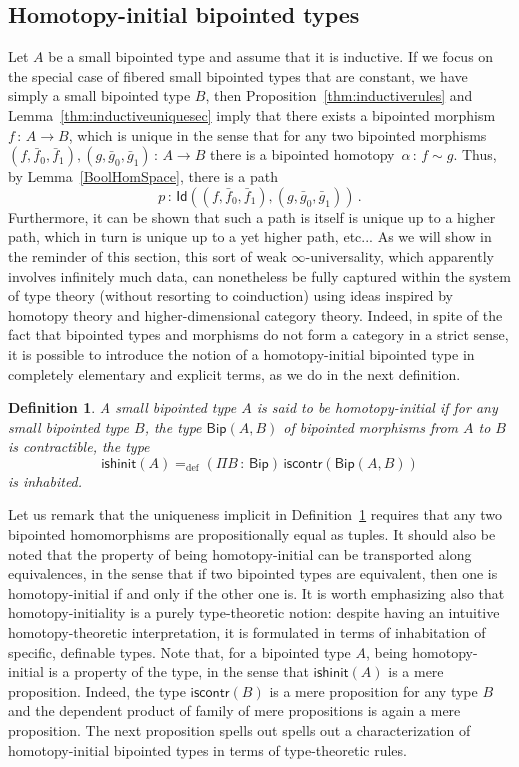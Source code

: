 \documentclass[10pt,a4paper,oneside,reqno]{amsart}
\numberwithin{equation}{section}
\theoremstyle{mythm}
\theoremstyle{mydef}
\newtheorem{definition}[theorem]{Definition}
\theoremstyle{myrmk}
\newcommand{\ie}{\text{i.e.\ }}
\newcommand{\defeq}{=_{\mathrm{def}}}
\newcommand{\co}{\,{:}\,}
\newcommand{\iscontr}{\mathsf{iscontr}}
\newcommand{\ishinit}{\mathsf{ishinit}}
\newcommand{\Id}{\mathsf{Id}}
\newcommand{\Bip}{\mathsf{Bip}}
\newcommand{\BipHom}{\mathsf{Bip}}
\begin{document}
\subsection{Homotopy-initial bipointed types} 
 Let $A$ be a small bipointed type and assume that it is inductive. 
  If we focus on the special case of fibered small bipointed types that 
are constant, \ie we have simply a small bipointed type $B$, then 
 Proposition~\ref{thm:inductiverules} and Lemma~\ref{thm:inductiveuniquesec}
imply that there exists a bipointed morphism~$f \co A \to B$, which is unique in the sense that  for any two bipointed morphisms $(f, \bar{f}_0, \bar{f}_1), (g, \bar{g}_0, \bar{g}_1) \co A \to B$  there is a bipointed homotopy~$\alpha \co f \sim g$. Thus, by Lemma~\ref{BoolHomSpace}, there is a path 
\[
p \co \Id((f, \bar{f}_0, \bar{f}_1), (g, \bar{g}_0, \bar{g}_1)) \, .
\] 
Furthermore, it can be shown that such a path is itself is unique up to a higher path, which in turn is unique up to a yet higher path, etc... As we will show in the reminder of this section, this sort of weak $\infty$-universality, which apparently involves infinitely much data, can nonetheless be fully captured within the system of type theory (without resorting to coinduction) using ideas inspired by homotopy theory and higher-dimensional category theory. Indeed, in spite of the fact that bipointed types and morphisms do not form a category in a strict sense, it is possible to introduce the  notion of a homotopy-initial bipointed type in completely elementary and explicit terms, as we do in the next definition.


\begin{definition}\label{def:BoolInit}
A small bipointed type $A$ is said to be \emph{homotopy-initial}  if for any small bipointed type $B$, the type $\BipHom(A,B)$ of bipointed morphisms from $A$ to $B$
is contractible, \ie the type
\[
\ishinit(A) \defeq (\Pi B \co \Bip) \, \iscontr(\BipHom(A, B) )
\] 
is inhabited.
\end{definition}

Let us remark that the uniqueness implicit in Definition~\ref{def:BoolInit} requires that any two bipointed homomorphisms are propositionally equal as tuples. It should also be noted that the property of being  homotopy-initial  can be transported along equivalences, in the sense that if two bipointed types are equivalent, then one is homotopy-initial if and only if the other one is. It is worth emphasizing also that homotopy-initiality is a purely type-theoretic notion: despite having an intuitive homotopy-theoretic interpretation, it is formulated in terms of inhabitation of specific, definable types. Note that, for a bipointed type $A$, being homotopy-initial is a property of the type, in the
sense that $\ishinit(A)$ is a mere proposition. Indeed, the type $\iscontr(B)$ is a mere proposition for any type $B$ and the dependent product of family of mere propositions is again a mere proposition.  The next proposition spells out spells out a  characterization of homotopy-initial bipointed types in terms of type-theoretic rules.
\end{document}
